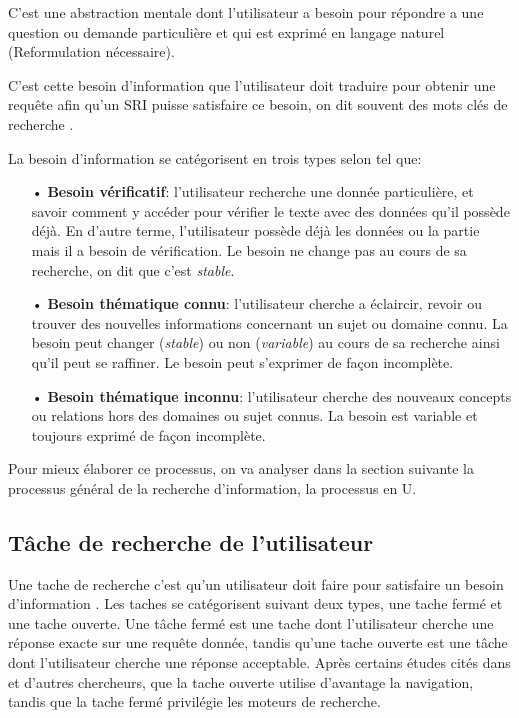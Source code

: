 \begin{definition}
    C'est une abstraction mentale dont l'utilisateur a besoin pour répondre a une question ou demande particulière et qui est exprimé en langage naturel \citep{amelioration-ri-approche-semantique} (Reformulation nécessaire).
\end{definition}

C'est cette besoin d'information que l'utilisateur doit traduire pour obtenir une requête afin qu'un SRI puisse satisfaire ce besoin, on dit souvent des mots clés de recherche \citep{modern-ir}.

La besoin d'information se catégorisent en trois types selon \citeauthor{paradis:tel-00005009} \citep{paradis:tel-00005009} tel que:
\begin{itemize}
    \item[•] \textbf{Besoin vérificatif}: l'utilisateur recherche une donnée particulière, et savoir comment y accéder pour vérifier le texte avec des données qu'il possède déjà. En d'autre terme, l'utilisateur possède déjà les données ou la partie mais il a besoin de vérification. Le besoin ne change pas au cours de sa recherche, on dit que c'est \textit{stable}.
    \item[•] \textbf{Besoin thématique connu}: l'utilisateur cherche a éclaircir, revoir ou trouver des nouvelles informations concernant un sujet ou domaine connu. La besoin peut changer (\textit{stable}) ou non (\textit{variable}) au cours de sa recherche ainsi qu'il peut se raffiner. Le besoin peut s'exprimer de façon incomplète.
    \item[•] \textbf{Besoin thématique inconnu}: l'utilisateur cherche des nouveaux concepts ou relations hors des domaines ou sujet connus. La besoin est variable et toujours exprimé de façon incomplète.
\end{itemize}

Pour mieux élaborer ce processus, on va analyser dans la section suivante la processus général de la recherche d'information, la processus en U.

\subsection{Tâche de recherche de l'utilisateur}
Une tache de recherche c'est qu'un utilisateur doit faire pour satisfaire un besoin d'information \citep*{boubee-tricot-2010,ri-sur-le-web}.
Les taches se catégorisent suivant deux types, une tache fermé et une tache ouverte. Une tâche fermé est une tache dont l'utilisateur cherche une réponse exacte sur une requête donnée, tandis qu'une tache ouverte est une tâche dont l'utilisateur cherche une réponse acceptable. Après certains études cités dans \citep{ri-sur-le-web} et d'autres chercheurs, que la tache ouverte utilise d'avantage la navigation, tandis que la tache fermé privilégie les moteurs de recherche.

